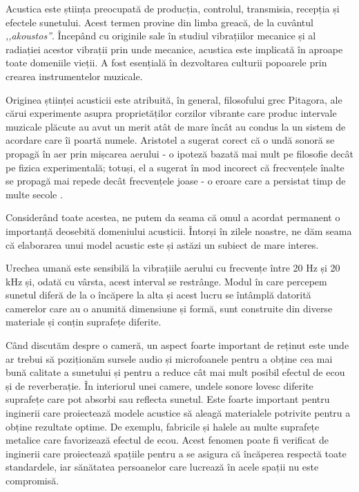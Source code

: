 Acustica este știința preocupată de producția, controlul, transmisia, recepția și efectele sunetului. Acest termen provine din limba greacă, de la cuvântul \textit{,,akoustos''}. Începând cu originile sale în studiul vibrațiilor mecanice și al radiației acestor vibrații prin unde mecanice, acustica este implicată în aproape toate domeniile vieții. A fost esențială în dezvoltarea culturii popoarele prin crearea instrumentelor muzicale.

Originea științei acusticii este atribuită, în general, filosofului grec Pitagora, ale cărui experimente asupra proprietăților corzilor vibrante care produc intervale muzicale plăcute au avut un merit atât de mare încât au condus la un sistem de acordare care îi poartă numele. Aristotel a sugerat corect că o undă sonoră se propagă în aer prin mișcarea aerului - o ipoteză bazată mai mult pe filosofie decât pe fizica experimentală; totuși, el a sugerat în mod incorect că frecvențele înalte se propagă mai repede decât frecvențele joase - o eroare care a persistat timp de multe secole \cite{istorie}.

Considerând toate acestea, ne putem da seama că omul a acordat permanent o importa\-nță deosebită domeniului acusticii. Întorși în zilele noastre, ne dăm seama că elaborarea unui model acustic este și astăzi un subiect de mare interes.

Urechea umană este sensibilă la vibrațiile aerului cu frecvențe între 20 Hz și 20 kHz și, odată cu vârsta, acest interval se restrânge. Modul în care percepem sunetul diferă de la o încăpere la alta și acest lucru se întâmplă datorită camerelor care au o anumită dimensiune și formă, sunt construite din diverse materiale și conțin suprafețe diferite.

Când discutăm despre o cameră, un aspect foarte important de reținut este unde ar trebui să poziționăm sursele audio și microfoanele pentru a obține cea mai bună calitate a sunetului și pentru a reduce cât mai mult posibil efectul de ecou și de reverberație. În interiorul unei camere, undele sonore lovesc diferite suprafețe care pot absorbi sau reflecta sunetul. Este foarte important pentru inginerii care proiectează modele acustice să aleagă materialele potrivite pentru a obține rezultate optime. De exemplu, fabricile și halele au multe suprafețe metalice care favorizează efectul de ecou. Acest fenomen poate fi verificat de inginerii care proiectează spațiile pentru a se asigura că încăperea respectă toate standardele, iar sănătatea persoanelor care lucrează în acele spații nu este compromisă.

